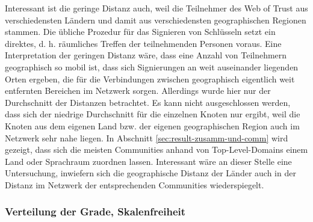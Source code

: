 Interessant ist die geringe Distanz auch, weil die Teilnehmer des Web
of Trust aus verschiedensten Ländern und damit aus verschiedensten
geographischen Regionen stammen. Die übliche Prozedur für das
Signieren von Schlüsseln setzt ein direktes, d. h. räumliches
Treffen der teilnehmenden Personen voraus. Eine Interpretation der
geringen Distanz wäre, dass eine Anzahl von Teilnehmern geographisch
so mobil ist, dass sich Signierungen an weit auseinander liegenden
Orten ergeben, die für die Verbindungen zwischen geographisch
eigentlich weit entfernten Bereichen im Netzwerk sorgen. Allerdings
wurde hier nur der Durchschnitt der Distanzen betrachtet. Es kann
nicht ausgeschlossen werden, dass sich der niedrige Durchschnitt für
die einzelnen Knoten nur ergibt, weil die Knoten aus dem eigenen Land
bzw. der eigenen geographischen Region auch im Netzwerk sehr nahe
liegen. In Abschnitt \ref{sec:result-zusamm-und-comm} wird gezeigt,
dass sich die meisten Communities anhand von Top-Level-Domains einem
Land oder Sprachraum zuordnen lassen. Interessant wäre an dieser
Stelle eine Untersuchung, inwiefern sich die geographische Distanz der
Länder auch in der Distanz im Netzwerk der entsprechenden
Communities wiederspiegelt.

\subsubsection{Verteilung der Grade, Skalenfreiheit}
\label{sec:verteilung-der-grade}


